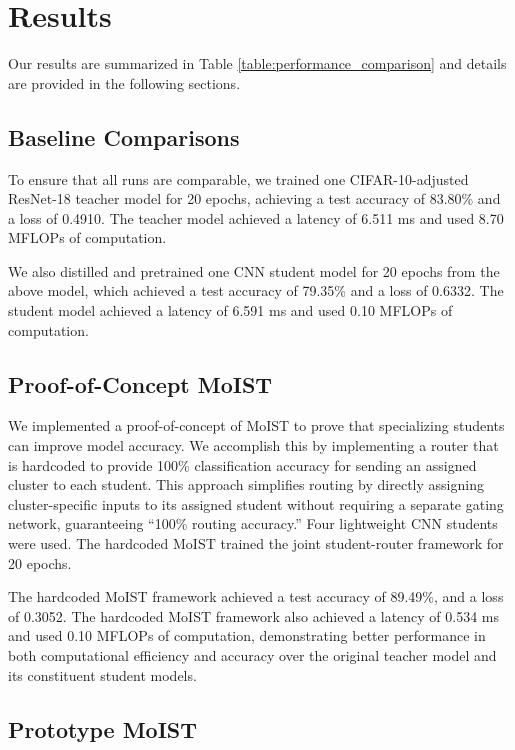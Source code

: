 \documentclass[conference]{IEEEtran}
\begin{document}
\section{Results}

Our results are summarized in Table \ref{table:performance_comparison} and details are provided in the following sections.

\subsection{Baseline Comparisons}

To ensure that all runs are comparable, we trained one CIFAR-10-adjusted ResNet-18 teacher model for 20 epochs, achieving a test accuracy of 83.80\% and a loss of 0.4910. The teacher model achieved a latency of 6.511 ms and used 8.70 MFLOPs of computation.

We also distilled and pretrained one CNN student model for 20 epochs from the above model, which achieved a test accuracy of 79.35\% and a loss of 0.6332. The student model achieved a latency of 6.591 ms and used 0.10 MFLOPs of computation.

\subsection{Proof-of-Concept MoIST}

We implemented a proof-of-concept of MoIST to prove that specializing students can improve model accuracy. We accomplish this by implementing a router that is hardcoded to provide 100\% classification accuracy for sending an assigned cluster to each student. This approach simplifies routing by directly assigning cluster-specific inputs to its assigned student without requiring a separate gating network, guaranteeing ``100\% routing accuracy.'' Four lightweight CNN students were used. The hardcoded MoIST trained the joint student-router framework for 20 epochs.

The hardcoded MoIST framework achieved a test accuracy of 89.49\%, and a loss of 0.3052. The hardcoded MoIST framework also achieved a latency of 0.534 ms and used 0.10 MFLOPs of computation, demonstrating better performance in both computational efficiency and accuracy over the original teacher model and its constituent student models.

\subsection{Prototype MoIST}
\end{document}
